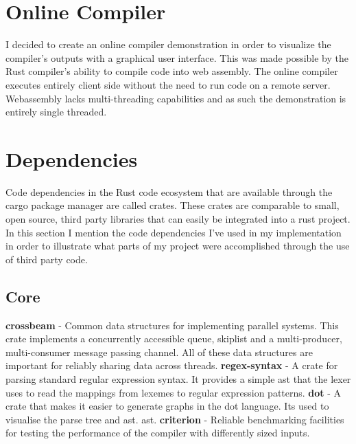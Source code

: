 \section{Online Compiler} \label{test_lang}

I decided to create an online compiler demonstration in order to visualize the compiler's outputs
with a graphical user interface. This was made possible by the Rust compiler's ability to compile
code into web assembly. The online compiler executes entirely client side without the need to run
code on a remote server. Webassembly lacks multi-threading capabilities and as such
the demonstration is entirely single threaded.

\section{Dependencies} \label{dependancies}

Code dependencies in the Rust code ecosystem that are  available through the cargo package manager
are called crates. These crates are comparable to small, open source, third party libraries that can
easily be integrated into a rust project. In this section I mention the code dependencies I've used
in my implementation in order to illustrate what parts of my project were accomplished through the
use of third party code.

\subsection{Core}

\textbf{crossbeam} - Common data structures for implementing parallel systems.
This crate implements a concurrently accessible queue, skiplist and a
multi-producer, multi-consumer message passing channel. All of these data
structures are important for reliably sharing data across threads.
\newline\newline
\textbf{regex-syntax} - A crate for parsing standard regular expression syntax.
It provides a simple \gls{ast} that the lexer uses to read the mappings from
lexemes to regular expression patterns.
\newline\newline
\textbf{dot} - A crate that makes it easier to generate graphs in the dot
language. Its used to visualise the parse tree and \gls{ast}.
\gls{ast}.
\newline\newline
\textbf{criterion} - Reliable benchmarking facilities for testing the performance of the
compiler with differently sized inputs.

